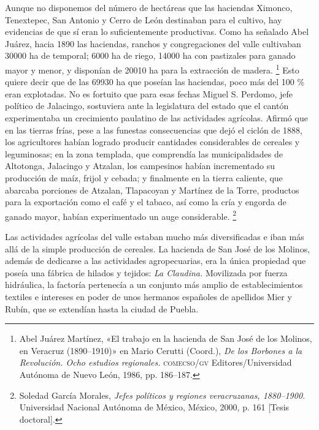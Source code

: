 \documentclass[14pt,twoside,final]{extbook} %
\let\oldfootnote\footnote
\renewcommand\footnote[1]{%
\oldfootnote{\hspace{1mm}#1}}
\begin{document}
Aunque no disponemos del número de hectáreas que las haciendas Ximonco, Tenextepec, San Antonio y Cerro de León destinaban para el cultivo, hay evidencias de que sí eran lo suficientemente productivas. Como ha señalado Abel Juárez, hacia 1890 las haciendas, ranchos y congregaciones del valle cultivaban 30000 ha de temporal; 6000 ha de riego, 14000 ha con pastizales para ganado mayor y menor, y disponían de 20010 ha para la extracción de madera.\footnote{Abel Juárez Martínez, «El trabajo en la hacienda de San José de los Molinos, en Veracruz (\mbox{1890--1910})» en Mario Cerutti (Coord.), \emph{De los Borbones a la Revolución. Ocho estudios regionales.} \textsc{comecso/gv} Editores/Universidad Autónoma de Nuevo León, 1986, pp. 186--187.} Esto quiere decir que de las 69930 ha que poseían las haciendas, poco más del 100 \% eran explotadas. No es fortuito que para esas fechas Miguel S. Perdomo, jefe político de Jalacingo, sostuviera ante la legislatura del estado que el cantón experimentaba un crecimiento paulatino de las actividades agrícolas. Afirmó que en las tierras frías, pese a las funestas consecuencias que dejó el ciclón de 1888, los agricultores habían logrado producir cantidades considerables de cereales y leguminosas; en la zona templada, que comprendía las municipalidades de Altotonga, Jalacingo y Atzalan, los campesinos habían incrementado su producción de maíz, frijol y cebada; y finalmente en la tierra caliente, que abarcaba porciones de Atzalan, Tlapacoyan y Martínez de la Torre, productos para la exportación como el café y el tabaco, así como la cría y engorda de ganado mayor, habían experimentado un auge considerable.\footnote{Soledad García Morales, \emph{Jefes políticos y regiones veracruzanas, 1880--1900.} Universidad Nacional Autónoma de México, México, 2000, p. 161 [Tesis doctoral].}

Las actividades agrícolas del valle estaban mucho más diversificadas e iban más allá de la simple producción de cereales. La hacienda de San José de los Molinos, además de dedicarse a las actividades agropecuarias, era la única propiedad que poseía una fábrica de hilados y tejidos: \emph{La Claudina.} Movilizada por fuerza hidráulica, la factoría pertenecía a un conjunto más amplio de establecimientos textiles e intereses en poder de unos hermanos españoles de apellidos Mier y Rubín, que se extendían hasta la ciudad de Puebla.
\end{document}

